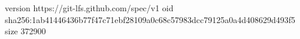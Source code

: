 version https://git-lfs.github.com/spec/v1
oid sha256:1ab41446436b77f47c71ebf28109a0c68c57983dcc79125a0a4d408629d493f5
size 372900
